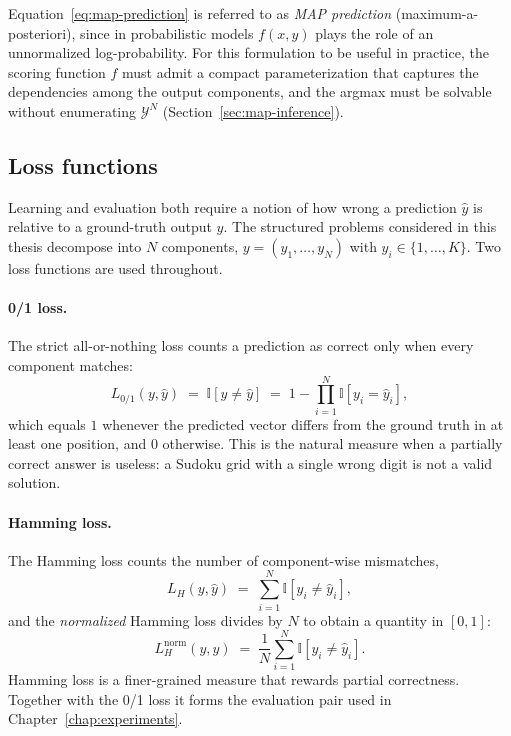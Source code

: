 Equation~\eqref{eq:map-prediction} is referred to as \emph{MAP
prediction} (maximum-a-posteriori), since in probabilistic models
$f(x, y)$ plays the role of an unnormalized log-probability. For this
formulation to be useful in practice, the scoring function $f$ must
admit a compact parameterization that captures the dependencies among
the output components, and the argmax must be solvable without
enumerating $\mathcal{Y}^{N}$ (Section~\ref{sec:map-inference}).


\subsection{Loss functions}
\label{subsec:loss-functions}

Learning and evaluation both require a notion of how wrong a prediction
$\hat{y}$ is relative to a ground-truth output $y$. The structured
problems considered in this thesis decompose into $N$ components,
$y = (y_1, \ldots, y_N)$ with $y_i \in \{1, \ldots, K\}$. Two loss
functions are used throughout.

\paragraph{0/1 loss.}
The strict all-or-nothing loss counts a prediction as correct only when
every component matches:
\begin{equation}
    L_{0/1}(y, \hat{y}) \;=\; \mathbb{I}\!\left[y \neq \hat{y}\right]
    \;=\; 1 - \prod_{i=1}^{N} \mathbb{I}\!\left[y_i = \hat{y}_i\right],
    \label{eq:zero-one-loss}
\end{equation}
which equals $1$ whenever the predicted vector differs from the
ground truth in at least one position, and $0$ otherwise. This is
the natural measure when a partially correct answer is useless: a
Sudoku grid with a single wrong digit is not a valid solution.

\paragraph{Hamming loss.}
The Hamming loss counts the number of component-wise mismatches,
\begin{equation}
    L_{H}(y, \hat{y}) \;=\; \sum_{i=1}^{N}
    \mathbb{I}\!\left[y_i \neq \hat{y}_i\right],
    \label{eq:hamming-loss}
\end{equation}
and the \emph{normalized} Hamming loss divides by $N$ to obtain a
quantity in $[0, 1]$:
\begin{equation}
    L_{H}^{\mathrm{norm}}(y, \hat{y}) \;=\;
    \frac{1}{N} \sum_{i=1}^{N}
    \mathbb{I}\!\left[y_i \neq \hat{y}_i\right].
    \label{eq:hamming-loss-norm}
\end{equation}
Hamming loss is a finer-grained measure that rewards partial
correctness. Together with the 0/1 loss it forms the evaluation pair
used in Chapter~\ref{chap:experiments}.

